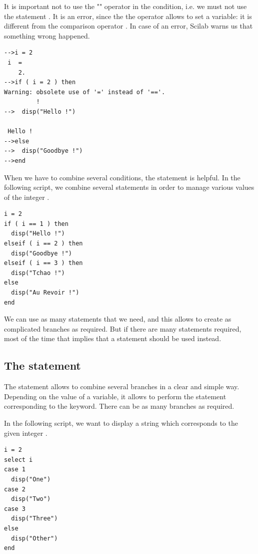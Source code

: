 It is important not to use the "\scivar{=}" operator in the condition, 
i.e. we must not use the statement .
It is an error, since the \scivar{=} the operator allows to 
set a variable: it is different from the comparison operator 
\scivar{==}. In case of an error, Scilab warns us that something wrong happened.
\lstset{language=scilabscript}
\begin{lstlisting}
-->i = 2
 i  =
    2.  
-->if ( i = 2 ) then 
Warning: obsolete use of '=' instead of '=='.
         !       
-->  disp("Hello !")
 
 Hello !   
-->else
-->  disp("Goodbye !")
-->end
\end{lstlisting}

When we have to combine several conditions, the  statement
is helpful. In the following script, we combine several  statements
in order to manage various values of the integer .
\lstset{language=scilabscript}
\begin{lstlisting}
i = 2
if ( i == 1 ) then 
  disp("Hello !")
elseif ( i == 2 ) then 
  disp("Goodbye !")
elseif ( i == 3 ) then 
  disp("Tchao !")
else
  disp("Au Revoir !")
end
\end{lstlisting}

We can use as many  statements that we need, and this 
allows to create as complicated branches as required. But if there 
are many  statements required, most of the time
that implies that a  statement should be 
used instead.

\subsection{The  statement}

The  statement allows to combine 
several branches in a clear and simple way. 
Depending on the value of a variable, it allows to perform
the statement corresponding to the 
keyword. There can be as many branches as required.

In the following script, we want to display a string 
which corresponds to the given integer .
\lstset{language=scilabscript}
\begin{lstlisting}
i = 2
select i
case 1
  disp("One")
case 2
  disp("Two")
case 3
  disp("Three")
else
  disp("Other")
end
\end{lstlisting}

